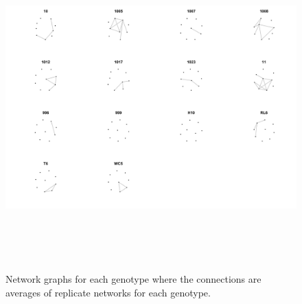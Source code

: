 \documentclass[11pt]{article}
\begin{document}
\begin{figure}[h]
\includegraphics[width=18cm,height=12.5cm]{genonets}
\caption{Network graphs for each genotype where the connections are averages of replicate networks for each genotype.}
\end{figure}
\end{document}
